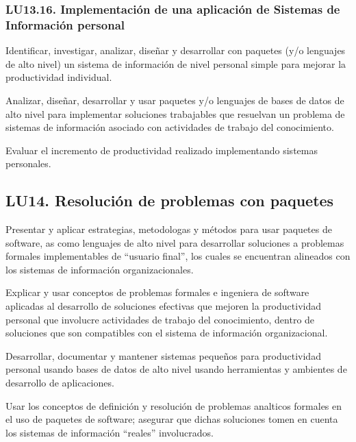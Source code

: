 \subsubsection{LU13.16. Implementación de una aplicación de Sistemas de Información personal}\label{sec:LU13.16}
\begin{LearningUnit}
\begin{LUGoal}
\item Identificar, investigar, analizar, diseñar y desarrollar con paquetes (y/o lenguajes de alto nivel) un sistema de información de nivel personal simple para mejorar la productividad individual.
\end{LUGoal}

\begin{LUObjective}
\item Analizar, diseñar, desarrollar y usar paquetes y/o lenguajes de bases de datos de alto nivel para implementar soluciones trabajables que resuelvan un problema de sistemas de información asociado con actividades de trabajo del conocimiento.
\item Evaluar el incremento de productividad realizado implementando sistemas personales.
\end{LUObjective}
\end{LearningUnit}

\subsection{LU14. Resolución de problemas con paquetes}\label{sec:LU14}
\begin{LearningUnit}
\begin{LUGoal}
\item Presentar y aplicar estrategias, metodolog­as y métodos para usar paquetes de software, as­ como lenguajes de alto nivel para desarrollar soluciones a problemas formales implementables de ``usuario final'', los cuales se encuentran alineados con los sistemas de información organizacionales.
\end{LUGoal}

\begin{LUObjective}
\item Explicar y usar conceptos de problemas formales e ingenier­a de software aplicadas al desarrollo de soluciones efectivas que mejoren la productividad personal que involucre actividades de trabajo del conocimiento, dentro de soluciones que son compatibles con el sistema de información organizacional.
\item Desarrollar, documentar y mantener sistemas pequeños para productividad personal usando bases de datos de alto nivel usando herramientas y ambientes de desarrollo de aplicaciones.
\item Usar los conceptos de definición y resolución de problemas anal­ticos formales en el uso de paquetes de software; asegurar que dichas soluciones tomen en cuenta los sistemas de información ``reales'' involucrados.
\end{LUObjective}
\end{LearningUnit}

